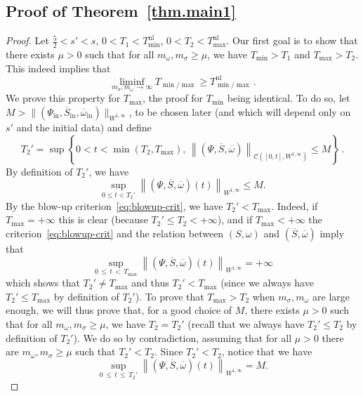 \documentclass[10pt]{amsart}
\theoremstyle{definition}\newtheorem{defi}[theo]{Definition}\newtheorem{rema}[theo]{Remark}\newtheorem{exam}[theo]{Example}\newtheorem{exem}[theo]{Example}\newtheorem{nota}[theo]{Notation}
\newcommand{\rmin}{\mathrm{in}}
\newcommand{\nl}{\mathrm{nl}}
\newcommand{\cC}{\mathcal{C}}
\renewcommand\bar{\overline}
\newcommand\ii{{\ensuremath {\infty}}}
\begin{document}
\subsection*{Proof of Theorem~\ref{thm.main1}}

\begin{proof}
Let $\tfrac52 <s'<s$, $0<T_1<T_{\min}^{\nl}$, $0<T_2<T_{\max}^{\nl}$. Our first goal is to show that there exists $\mu>0$ such that for all $m_\omega,m_\sigma\geq \mu$, we have $T_{\min}>T_1$ and $T_{\max}>T_2$. This indeed implies that
\begin{equation*}
\liminf_{m_\sigma, m_\omega\,\to \infty}T_{\min/\max}\geq T_{\min/\max}^{\nl}\,.
\end{equation*}
We prove this property for $T_{\max}$, the proof for $T_{\min}$ being identical. To do so, let $M>\|(\Psi_\rmin, \overline{S}_\rmin, \overline{\omega}_\rmin)\|_{W^{1,\infty}}$, to be chosen later (and which will depend only on $s'$ and the initial data) and define
\[
T_2' = \sup\left\{0<t<\min(T_2,T_{\max}),\,\left\|(\Psi,\overline{S}, \overline{\omega})\right\|_{\cC\left([0,t], W^{1,\infty}\right)}\leq M\right\}\,.
\]
By definition of $T_2'$, we have
\begin{equation}\label{eq:bound-T2prime}
\sup_{0\leq t<T_2'}\left\|(\Psi,\overline{S}, \overline{\omega})(t)\right\|_{W^{1,\infty}}\leq M.
\end{equation}
By the blow-up criterion~\eqref{eq:blowup-crit}, we have $T_2'<T_{\max}$. Indeed, if $T_{\max}=+\ii$ this is clear (because $T_2'\leq T_2<+\ii$), and if $T_{\max}<+\ii$ the criterion~\eqref{eq:blowup-crit} and the relation between $(S,\omega)$ and $(\bar{S},\bar{\omega})$ imply that
\[
\sup_{0\,\leq\,t\,<\,T_{\max}}\left\|(\Psi,\overline{S}, \overline{\omega})(t)\right\|_{W^{1,\infty}}=+\ii
\]
which shows that $T_2'\neq T_{\max}$ and thus $T_2'<T_{\max}$ (since we always have $T_2'\leq T_{\max}$ by definition of $T_2'$). To prove that $T_{\max}>T_2$ when $m_\sigma,m_\omega$ are large enough, we will thus prove that, for a good choice of $M$, there exists $\mu>0$ such that for all $m_\omega,m_\sigma\geq \mu$, we have $T_2=T_2'$ (recall that we always have $T_2'\leq T_2$ by definition of $T_2'$). We do so by contradiction, assuming that for all $\mu>0$ there are $m_\omega,m_\sigma\geq\mu$ such that $T_2'<T_2$. Since $T_2'<T_2$, notice that we have
\begin{equation}\label{eq:bound-T2prime-2}
\sup_{0\,\leq \,t\,\leq \,T_2'} \left\|(\Psi,\overline{S}, \overline{\omega})(t)\right\|_{W^{1,\infty}}=M.
\end{equation}

\end{proof}
\end{document}
